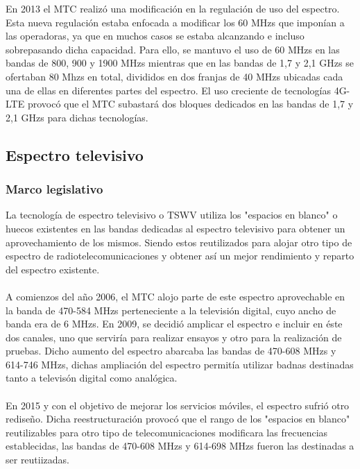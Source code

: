 En 2013 el MTC realizó una modificación en la regulación de uso del espectro. Esta nueva regulación estaba enfocada a modificar los 60 MHzs que imponían a las operadoras, ya que en muchos casos se estaba alcanzando e incluso sobrepasando dicha capacidad. Para ello, se mantuvo el uso de 60 MHzs en las bandas de 800, 900 y 1900 MHzs mientras que en las bandas de 1,7 y 2,1 GHzs se ofertaban 80 Mhzs en total, divididos en dos franjas de 40 MHzs ubicadas cada una de ellas en diferentes partes del espectro. El uso creciente de tecnologías 4G-LTE provocó que el MTC subastará dos bloques dedicados en las bandas de 1,7 y 2,1 GHzs para dichas tecnologías.

\subsection{Espectro televisivo}

\subsubsection{Marco legislativo}
La tecnología de espectro televisivo o TSWV utiliza los "espacios en blanco" o huecos existentes en las bandas dedicadas al espectro televisivo para obtener un aprovechamiento de los mismos. Siendo estos reutilizados para alojar otro tipo de espectro de radiotelecomunicaciones y obtener así un mejor rendimiento y reparto del espectro existente.\\\\

A comienzos del año 2006, el MTC alojo parte de este espectro aprovechable en la banda de 470-584 MHzs perteneciente a la televisión digital, cuyo ancho de banda era de 6 MHzs. En 2009, se decidió amplicar el espectro e incluir en éste dos canales, uno que serviría para realizar ensayos y otro para la realización de pruebas. Dicho aumento del espectro abarcaba las bandas de 470-608 MHzs y 614-746 MHzs, dichas ampliación del espectro permitía utilizar badnas destinadas tanto a televisón digital como analógica. \\\\

En 2015 y con el objetivo de mejorar los servicios móviles, el espectro sufrió otro rediseño. Dicha reestructuración provocó que el rango de los "espacios en blanco" reutilizables para otro tipo de telecomunicaciones modificara las frecuencias establecidas, las bandas de 470-608 MHzs y 614-698 MHzs fueron las destinadas a ser reutiizadas.

